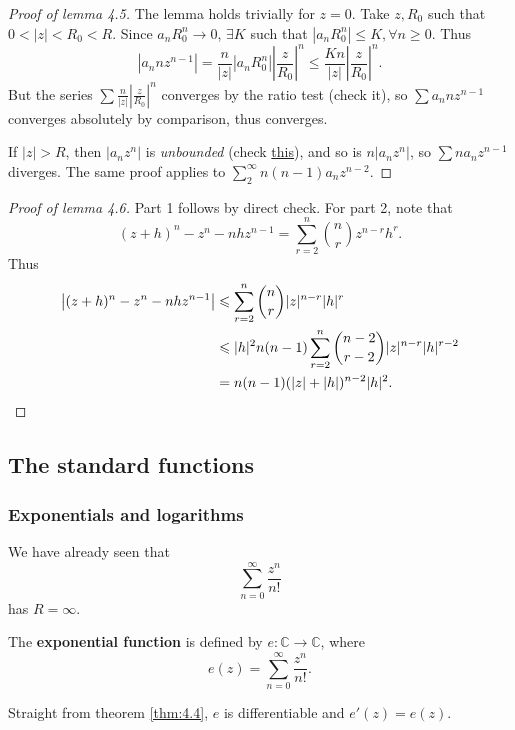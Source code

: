 \begin{proof}[Proof of lemma 4.5]
    The lemma holds trivially for $z=0$.
    Take $z,R_0$ such that $ 0<|z|<R_0<R $. Since $ a_nR_0^n\to 0 $, $ \exists K $ such that $ |a_n R_0^n|\le K, \forall n\ge 0 $. Thus 
    \[
        \left| a_n n z^{n-1} \right| = \frac{n}{|z|} \left| a_n R_0^n \right| \left| \frac{z}{R_0} \right|^n \le \frac{Kn}{|z|}\left| \frac{z}{R_0} \right|^n.
    \]
    But the series $\sum \frac{n}{|z|}| \frac{z}{R_0} |^n$ converges by the ratio test (check it), so $ \sum a_n n z^{n-1} $ converges absolutely by comparison, thus converges.

    If $ |z|>R $, then $ |a_nz^n| $ is \textit{unbounded} (check \href{https://math.stackexchange.com/questions/799481/absolute-sequence-unbounded-within-radius-of-convergence}{this}), and so is $ n|a_nz^n| $, so $ \sum na_n z^{n-1} $ diverges. The same proof applies to $\sum_{2}^\infty n(n-1)a_n z^{n-2}$.
\end{proof}
\begin{proof}[Proof of lemma 4.6]
    Part 1 follows by direct check. For part 2, note that
    \[
        (z+h)^n-z^n-nhz^{n-1} = \sum_{r=2}^{n}\binom{n}{r} z^{n-r}h^r.
    \] 
    Thus 
    \begin{align*}
        \left| (z+h)^n-z^n-nhz^{n-1} \right| &\le \sum_{r=2}^{n}\binom{n}{r} |z|^{n-r}|h|^r \\ 
        &\le |h|^2 n(n-1) \sum_{r=2}^{n}\binom{n-2}{r-2}|z|^{n-r}|h|^{r-2}\\
        &= n(n-1)(|z|+|h|)^{n-2}|h|^2. \qedhere
    \end{align*}
\end{proof}

\subsection{The standard functions}
\subsubsection*{Exponentials and logarithms}
We have already seen that 
\[
    \sum_{n=0}^{\infty} \frac{z^n}{n!}
\]
has $ R=\infty $.
\begin{definition}
    The \textbf{exponential function} is defined by $ e:\mathbb{C}\to\mathbb{C} $, where
    \[
        e(z) = \sum_{n=0}^{\infty} \frac{z^n}{n!}.
    \]
\end{definition}
Straight from theorem \ref{thm:4.4}, $ e $ is differentiable and $ e'(z)=e(z) $.

